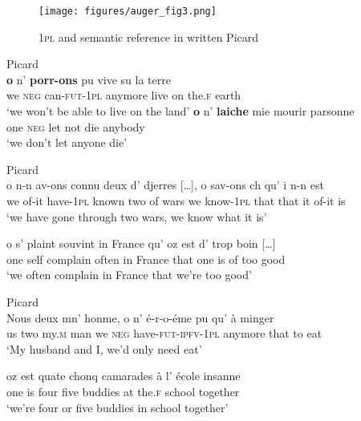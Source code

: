 \documentclass[output=paper,colorlinks,citecolor=brown]{langscibook}
\begin{document}
\begin{figure}[t]
    \texttt{[image: figures/auger\_fig3.png]}
    \caption{1\textsc{pl} and semantic reference in written Picard}
    \label{02:Fig3}
\end{figure}

\ea \label{02:ex:9} Picard\\
\ea
\gll \textbf{o} 	n’    \textbf{porr-ons} 	   pu 	      vive  su  la      terre\\
we 	\textsc{neg} can-\textsc{fut}-1\textsc{pl} anymore live  on the.\textsc{f} earth\\ 
\glt    ‘we won’t be able to live on the land’
\ex
\gll \textbf{o} n’ \textbf{laiche} mie mourir parsonne \\
one \textsc{neg} let not die anybody\\ 
\glt ‘we don’t let anyone die’
\z
\z

\newpage

\ea \label{02:ex:10} Picard\\
\ea
\gll o    n-n  av-ons    connu   deux d’ djerres [\ldots], o    sav-ons    ch   qu’ i  n-n   est  \\
we of-it have-1\textsc{pl} known  two  of wars 	 {}    we know-1\textsc{pl} that that it of-it is\\ 
\glt ‘we have gone through two wars, we know what it is’

\ex
\gll o     s’    plaint       souvint in France qu’  oz   est  d’ trop boin [\ldots] \\
one self  complain  often    in France  that one is   of  too  good\\ 
\glt ‘we often complain in France that we’re too good’
\z
\z

\ea \label{02:ex:11}Picard\\
\ea
\gll Nous deux  mn’   honme, o    n’    é-r-o-éme	   pu 	     qu’  à  minger\\
us       two  my.\textsc{m}  man     we \textsc{neg}  have-\textsc{fut}-\textsc{ipfv}-1\textsc{pl} anymore that to eat\\ 
\glt ‘My husband and I, we’d only need eat’

\ex
\gll oz   est  quate chonq  camarades 	à   l’       école    insanne \\
one  is   four    five     buddies 	at  the.\textsc{f}  school  together\\ 
\glt ‘we’re four or five buddies in school together’
\z
\z
\end{document}
